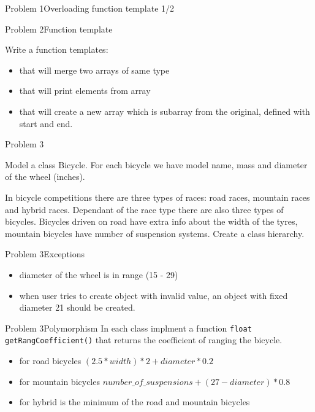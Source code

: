 \begin{frame}[fragile]{Problem 1}{Overloading function template 1/2}

\end{frame}

\begin{frame}{Problem 2}{Function template}
\begin{scriptsize}
Write a function templates:
\begin{itemize}
  \item that will merge two arrays of same type
  \item that will print elements from array
  \item that will create a new array which is subarray from the original,
  defined with start and end.
\end{itemize}
\end{scriptsize}
\end{frame}

\begin{frame}{Problem 3}
\begin{scriptsize}
Model a class Bicycle. For each bicycle we have model name, mass and diameter of
the wheel (inches).

In bicycle competitions there are three types of races: road races, mountain
races and hybrid races. Dependant of the race type there are also three types of
bicycles. Bicycles driven on road have extra info about the width of the tyres,
mountain bicycles have number of suspension systems. Create a class hierarchy.
\end{scriptsize}
\end{frame}

\begin{frame}{Problem 3}{Exceptions}
\begin{itemize}
  \item diameter of the wheel is in range (15 - 29)
  \item when user tries to create object with invalid value, an object with
  fixed diameter 21 should be created.
\end{itemize}
\end{frame}

\begin{frame}{Problem 3}{Polymorphism}
In each class implment a function \texttt{float getRangCoefficient()} that
returns the coefficient of ranging the bicycle.

\begin{itemize}
  \item for road bicycles $(2.5 * width) * 2 + diameter * 0.2$
  \item for mountain bicycles $number\_of\_suspensions + (27 - diameter) * 0.8$
  \item for hybrid is the minimum of the road and mountain bicycles
\end{itemize}
\end{frame}

